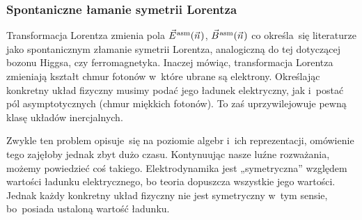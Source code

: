 \documentclass[10pt,t]{beamer}
\begin{document}
\begin{frame}
  \frametitle{Spontaniczne łamanie symetrii Lorentza}


  Transformacja Lorentza zmienia pola $\vec{E}^{ \hspace{0.05em} \text{asm} }( \vec{n} \hspace{0.05em} )$, $\vec{B}^{ \hspace{0.05em} \text{asm} }( \vec{n} \hspace{0.05em} )$ co określa~się
  literaturze jako spontanicznym złamanie symetrii Lorentza, analogiczną do
  tej dotyczącej bozonu Higgsa, czy ferromagnetyka. Inaczej mówiąc,
  transformacja Lorentza zmieniają kształt chmur fotonów w~które ubrane są
  elektrony. Określając konkretny układ fizyczny musimy podać jego ładunek
  elektryczny, jak i~postać pól asymptotycznych (chmur miękkich fotonów).
  To zaś uprzywilejowuje pewną klasę układów inercjalnych.

  Zwykle ten problem opisuje~się na poziomie algebr i~ich reprezentacji,
  omówienie tego zajęłoby jednak zbyt dużo czasu. Kontynuując nasze luźne
  rozważania, możemy powiedzieć coś takiego. Elektrodynamika jest
  „symetryczna” względem wartości ładunku elektrycznego, bo teoria dopuszcza
  wszystkie jego wartości. Jednak każdy konkretny \alert{układ} fizyczny
  nie jest symetryczny w~tym sensie, bo~posiada ustaloną wartość ładunku.

\end{frame}
\end{document}
